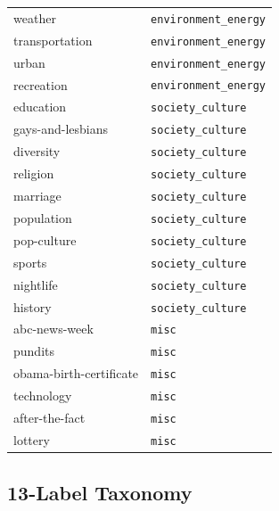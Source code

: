 \begin{longtable}{ll}
weather & \texttt{environment\_energy} \\
transportation & \texttt{environment\_energy} \\
urban & \texttt{environment\_energy} \\
recreation & \texttt{environment\_energy} \\
\midrule
education & \texttt{society\_culture} \\
gays-and-lesbians & \texttt{society\_culture} \\
diversity & \texttt{society\_culture} \\
religion & \texttt{society\_culture} \\
marriage & \texttt{society\_culture} \\
population & \texttt{society\_culture} \\
pop-culture & \texttt{society\_culture} \\
sports & \texttt{society\_culture} \\
nightlife & \texttt{society\_culture} \\
history & \texttt{society\_culture} \\
\midrule
abc-news-week & \texttt{misc} \\
pundits & \texttt{misc} \\
obama-birth-certificate & \texttt{misc} \\
technology & \texttt{misc} \\
after-the-fact & \texttt{misc} \\
lottery & \texttt{misc} \\
\end{longtable}

\subsection{13-Label Taxonomy}
\label{app:domain_mapping_13}

